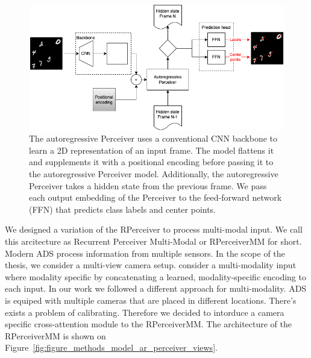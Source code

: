 \begin{figure}
    \centering
    \includegraphics[width=\textwidth]{figures/figure_methods_model_ar_perceiver.png}
    \caption{The autoregressive Perceiver uses a conventional CNN backbone to learn a 2D representation of an input frame. The model flattens it and supplements it with a positional encoding before passing it to the autoregressive Perceiver model. Additionally, the autoregressive Perceiver takes a hidden state from the previous frame. We pass each output embedding of the Perceiver to the feed-forward network (FFN) that predicts class labels and center points.}
    \label{fig:figure_methods_model_ar_perceiver}
\end{figure}

We designed a variation of the RPerceiver to process multi-modal input. We call this arcitecture as Recurrent Perceiver Multi-Modal or RPerceiverMM for short. Modern ADS process information from multiple sensors. In the scope of the thesis, we consider a multi-view camera setup. \cite{jaeglePerceiverGeneralPerception2021} consider a multi-modality input where modality specific by concatenating a learned, modality-specific encoding to each input. In our work we followed a different approach for multi-modality. ADS is equiped with multiple cameras that are placed in different locations. There's exists a problem of calibrating. Therefore we decided to intorduce a camera specific cross-attention module to the RPerceiverMM. The architecture of the RPerceiverMM is shown on Figure~\ref{fig:figure_methods_model_ar_perceiver_views}.


